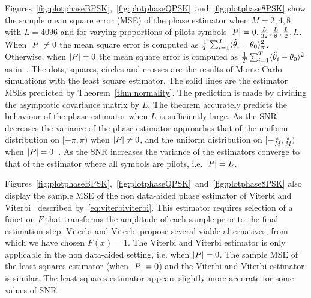 \documentclass[journal]{IEEEtran}
\begin{document}
Figures~\ref{fig:plotphaseBPSK},~\ref{fig:plotphaseQPSK}~and~\ref{fig:plotphase8PSK} show the sample mean square error (MSE) of the phase estimator when $M=2,4,8$ with $L=4096$ and for varying proportions of pilots symbols ${\left\vert P \right\vert} = 0, \tfrac{L}{32}, \tfrac{L}{8}, \tfrac{L}{2}, L$.  When ${\left\vert P \right\vert} \neq 0$ the mean square error is computed as $\tfrac{1}{T}\sum_{i=1}^T\langle \hat{\theta}_i - \theta_0 \rangle_\pi^2$.  Otherwise, when ${\left\vert P \right\vert}=0$ the mean square error is computed as $\tfrac{1}{T}\sum_{i=1}^T\langle \hat{\theta}_i - \theta_0 \rangle^2$ as in~\cite{McKilliam_leastsqPSKnoncoICASSP_2012}.  The dots, squares, circles and crosses are the results of Monte-Carlo simulations with the least square estimator.  The solid lines are the estimator MSEs predicted by Theorem~\ref{thm:normality}.   %
The prediction is made by dividing the asymptotic covariance matrix by $L$.  The theorem accurately predicts the behaviour of the phase estimator when $L$ is sufficiently large.  As the SNR decreases the variance of the phase estimator approaches that of the uniform distribution on $[-\pi, \pi)$ when ${\left\vert P \right\vert} \neq 0$, and the uniform distribution on $[-\tfrac{\pi}{M}, \tfrac{\pi}{M})$ when ${\left\vert P \right\vert}=0$~\cite{McKilliam_leastsqPSKnoncoICASSP_2012}.  As the SNR increases the variance of the estimators converge to that of the estimator where all symbols are pilots, i.e. ${\left\vert P \right\vert} = L$.


Figures~\ref{fig:plotphaseBPSK},~\ref{fig:plotphaseQPSK}~and~\ref{fig:plotphase8PSK} also display the sample MSE of the non data-aided phase estimator of Viterbi and Viterbi~\cite{ViterbiViterbi_phase_est_1983} described by~\eqref{eq:viterbiviterbi}.  This estimator requires selection of a function $F$ that transforms the amplitude of each sample prior to the final estimation step.  %
Viterbi and Viterbi propose several viable alternatives, from which we have chosen $F(x) = 1$.  The Viterbi and Viterbi estimator is only applicable in the non data-aided setting, i.e. when ${\left\vert P \right\vert} = 0$.  The sample MSE of the least squares estimator (when ${\left\vert P \right\vert} = 0$) and the Viterbi and Viterbi estimator is similar.  The least squares estimator appears slightly more accurate for some values of SNR.
\end{document}

